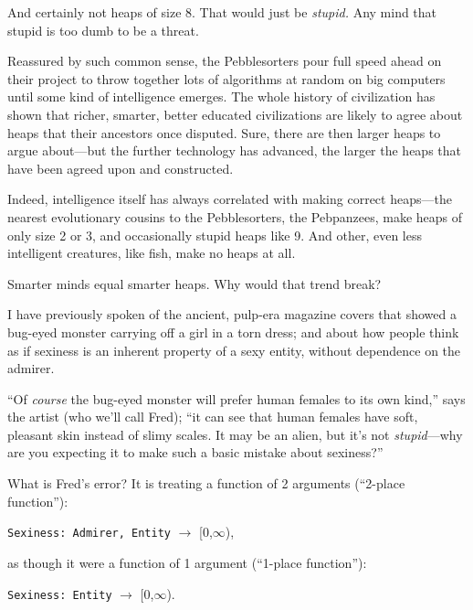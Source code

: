  And certainly not heaps of size 8. That would just be
\textit{stupid.} Any mind that stupid is too dumb to be a threat.


 Reassured by such common sense, the Pebblesorters pour full speed
ahead on their project to throw together lots of algorithms at random
on big computers until some kind of intelligence emerges. The whole
history of civilization has shown that richer, smarter, better educated
civilizations are likely to agree about heaps that their ancestors once
disputed. Sure, there are then larger heaps to argue about---but the
further technology has advanced, the larger the heaps that have been
agreed upon and constructed.


 Indeed, intelligence itself has always correlated with making
correct heaps---the nearest evolutionary cousins to the Pebblesorters,
the Pebpanzees, make heaps of only size 2 or 3, and occasionally stupid
heaps like 9. And other, even less intelligent creatures, like fish,
make no heaps at all.


 Smarter minds equal smarter heaps. Why would that trend break?

\myendsectiontext



 I have previously spoken of the ancient, pulp-era magazine covers
that showed a bug-eyed monster carrying off a girl in a torn dress; and
about how people think as if sexiness is an inherent property of a sexy
entity, without dependence on the admirer. 


 ``Of \textit{course} the bug-eyed monster will
prefer human females to its own kind,'' says the
artist (who we'll call Fred); ``it can
see that human females have soft, pleasant skin instead of slimy
scales. It may be an alien, but it's not
\textit{stupid}{}---why are you expecting it to make such a basic
mistake about sexiness?''


 What is Fred's error? It is treating a function of
2 arguments (``2-place function''):

\begin{center}
 \texttt{Sexiness: Admirer, Entity} $\rightarrow $ [0,${\infty}$),
\end{center}



 as though it were a function of 1 argument
(``1-place function''):

\begin{center}
 \texttt{Sexiness: Entity} $\rightarrow $ [0,${\infty}$).
\end{center}



